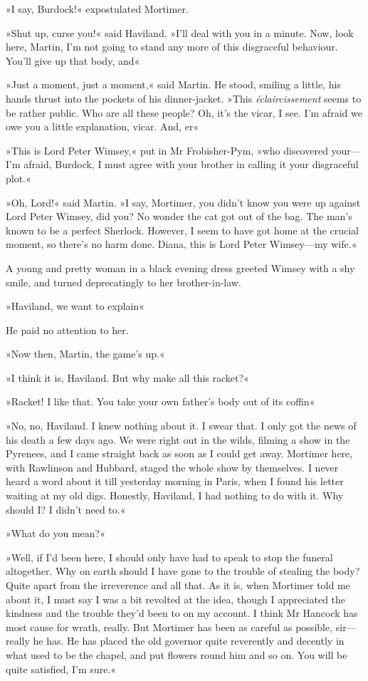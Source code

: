 »I say, Burdock!« expostulated Mortimer.

»Shut up, curse you!« said Haviland. »I'll deal with you in a minute. Now, look here, Martin, I'm not going to stand any more of this disgraceful behaviour. You'll give up that body, and\longdash«

»Just a moment, just a moment,« said Martin. He stood, smiling a little, his hands thrust into the pockets of his dinner-jacket. »This \textit{éclaircissement} seems to be rather public. Who are all these people? Oh, it's the vicar, I see. I'm afraid we owe you a little explanation, vicar. And, er\longdash«

»This is Lord Peter Wimsey,« put in Mr Frobisher-Pym, »who discovered your—I'm afraid, Burdock, I must agree with your brother in calling it your disgraceful plot.«

»Oh, Lord!« said Martin. »I say, Mortimer, you didn't know you were up against Lord Peter Wimsey, did you? No wonder the cat got out of the bag. The man's known to be a perfect Sherlock. However, I seem to have got home at the crucial moment, so there's no harm done. Diana, this is Lord Peter Wimsey—my wife.«

A young and pretty woman in a black evening dress greeted Wimsey with a shy smile, and turned deprecatingly to her brother-in-law.

»Haviland, we want to explain\longdash«

He paid no attention to her.

»Now then, Martin, the game's up.«

»I think it is, Haviland. But why make all this racket?«

»Racket! I like that. You take your own father's body out of its coffin\longdash«

»No, no, Haviland. I knew nothing about it. I swear that. I only got the news of his death a few days ago. We were right out in the wilds, filming a show in the Pyrenees, and I came straight back as soon as I could get away. Mortimer here, with Rawlinson and Hubbard, staged the whole show by themselves. I never heard a word about it till yesterday morning in Paris, when I found his letter waiting at my old digs. Honestly, Haviland, I had nothing to do with it. Why should I? I didn't need to.«

»What do you mean?«

»Well, if I'd been here, I should only have had to speak to stop the funeral altogether. Why on earth should I have gone to the trouble of stealing the body? Quite apart from the irreverence and all that. As it is, when Mortimer told me about it, I must say I was a bit revolted at the idea, though I appreciated the kindness and the trouble they'd been to on my account. I think Mr Hancock has most cause for wrath, really. But Mortimer has been as careful as possible, sir—really he has. He has placed the old governor quite reverently and decently in what used to be the chapel, and put flowers round him and so on. You will be quite satisfied, I'm sure.«

